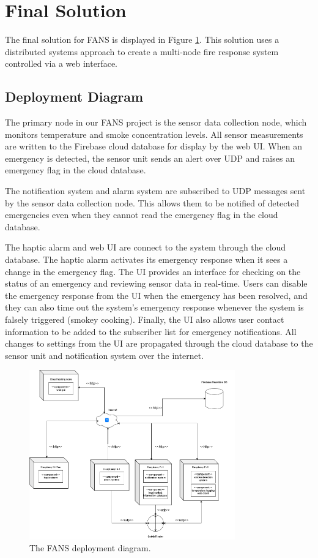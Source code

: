 \section{Final Solution} \label{sec:final-solution}

The final solution for FANS is displayed in Figure \ref{fig:deployment}. This solution uses a distributed systems
approach to create a multi-node fire response system controlled via a web interface.

\subsection{Deployment Diagram}

The primary node in our FANS project is the sensor data collection node, which monitors temperature and smoke
concentration levels. All sensor measurements are written to the Firebase cloud database for display by the web UI.
When an emergency is detected, the sensor unit sends an alert over UDP and raises an emergency flag in the cloud
database.

The notification system and alarm system are subscribed to UDP messages sent by the sensor data collection node. This
allows them to be notified of detected emergencies even when they cannot read the emergency flag in the cloud database.

The haptic alarm and web UI are connect to the system through the cloud database. The haptic alarm activates its
emergency response when it sees a change in the emergency flag. The UI provides an interface for checking on the status
of an emergency and reviewing sensor data in real-time. Users can disable the emergency response from the UI when the
emergency has been resolved, and they can also time out the system’s emergency response whenever the system is falsely
triggered (smokey cooking). Finally, the UI also allows user contact information to be added to the subscriber list for
emergency notifications. All changes to settings from the UI are propagated through the cloud database to the sensor
unit and notification system over the internet.

\begin{figure}
    \centering
    \includegraphics[width=3.5in]{../assets/FANSDeployment.png}
    \caption{The FANS deployment diagram.}
    \label{fig:deployment}
\end{figure}

